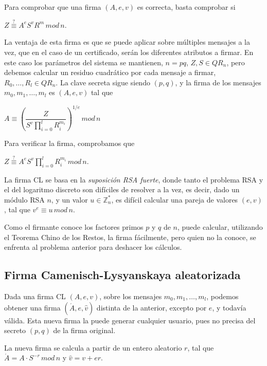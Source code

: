 Para comprobar que una firma $(A,e,v)$ es correcta, basta comprobar si
\begin{center}
	$Z \overset{?}{\equiv} A^e S^v R^m \, mod \, n$.
\end{center}

\hfil

La ventaja de esta firma es que se puede aplicar sobre múltiples mensajes a la vez, que en el caso de un certificado, serán los diferentes atributos a firmar. En este caso los parámetros del sistema se mantienen, $n=pq$, $Z,S\in QR_n$, pero debemos calcular un residuo cuadrático por cada mensaje a firmar, $R_0,\dots,R_l\in QR_n$. La clave secreta sigue siendo $(p,q)$, y la firma de los mensajes $m_0,m_1,\dots,m_l$ es $(A,e,v)$ tal que
\begin{center}
	$A \equiv \left( \dfrac{Z}{S^v \prod_{i=0}^{l} R_i^{m_i} } \right) ^{1/e} \, mod \, n$
\end{center}

\hfil

Para verificar la firma, comprobamos que
\begin{center}
	$Z \overset{?}{\equiv} A^e S^v \prod_{i=0}^{l} R_i^{m_i} \, mod \, n$.
\end{center}


La firma CL se basa en la \textit{suposición RSA fuerte}, donde tanto el problema RSA y el del logaritmo discreto son difíciles de resolver a la vez, es decir, dado un módulo RSA $n$, y un valor $u\in \mathbb{Z}_n^*$, es difícil calcular una pareja de valores $(e,v)$, tal que $v^e \equiv u \, mod \, n$.



Como el firmante conoce los factores primos $p$ y $q$ de $n$, puede calcular, utilizando el Teorema Chino de los Restos, la firma fácilmente, pero quien no la conoce, se enfrenta al problema anterior para deshacer los cálculos.


\subsection{Firma Camenisch-Lysyanskaya aleatorizada}\label{CLrandomized}

Dada una firma CL $(A,e,v)$, sobre los mensajes  $m_0,m_1,\dots,m_l$, podemos obtener una firma $(\acute{A},e,\hat{v})$ distinta de la anterior, excepto por $e$, y todavía válida. Esta nueva firma la puede generar cualquier usuario, pues no precisa del secreto $(p,q)$ de la firma original.

La nueva firma se calcula a partir de un entero aleatorio $r$, tal que $\acute{A}= A\cdot S^{-r}\, mod\, n$ y $\hat{v}=v+er$.

